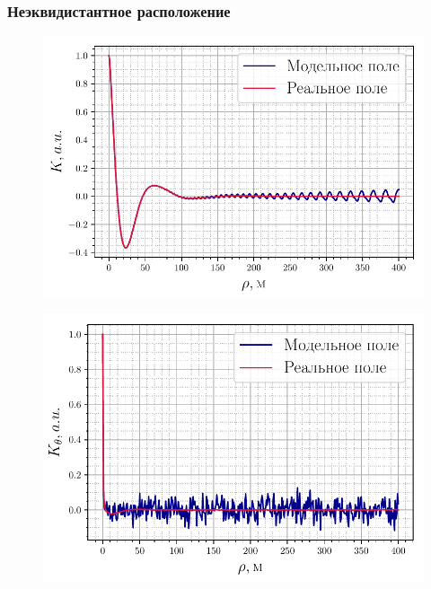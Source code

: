 \documentclass[10pt,pdf,hyperref={unicode}, dvipsnames]{beamer}
\begin{document}
\begin{frame}[t]
\begin{figure}[h!]
	\end{figure}



\end{frame}


\begin{frame}[t]\frametitle{Неэквидистантное расположение}
    
\begin{figure}[h!]
	\begin{minipage}{0.49\linewidth}
			\centering
			\includegraphics[width=\linewidth]{fig/correlation_height_log.pdf}
			\label{fig:ch1}		
	\end{minipage}
	\hfill
	\begin{minipage}{0.49\linewidth}
			\centering
			\includegraphics[width=\linewidth]{fig/correlation_angles_log.pdf}

\end{minipage}
\end{figure}
\end{frame}
\end{document}
